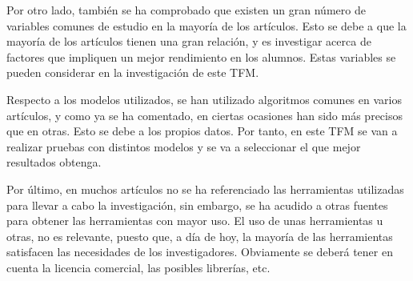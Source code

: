 Por otro lado, también se ha comprobado que existen un gran número de variables comunes de estudio en la mayoría de los artículos. Esto se debe a que la mayoría de los artículos tienen una gran relación, y es investigar acerca de factores que impliquen un mejor rendimiento en los alumnos. Estas variables se pueden considerar en la investigación de este TFM.

Respecto a los modelos utilizados, se han utilizado algoritmos comunes en varios artículos, y como ya se ha comentado, en ciertas ocasiones han sido más precisos que en otras. Esto se debe a los propios datos. Por tanto, en este TFM se van a realizar pruebas con distintos modelos y se va a seleccionar el que mejor resultados obtenga.

Por último, en muchos artículos no se ha referenciado las herramientas utilizadas para llevar a cabo la investigación, sin embargo, se ha acudido a otras fuentes para obtener las herramientas con mayor uso. El uso de unas herramientas u otras, no es relevante, puesto que, a día de hoy, la mayoría de las herramientas satisfacen las necesidades de los investigadores. Obviamente se deberá tener en cuenta la licencia comercial, las posibles librerías, etc.




